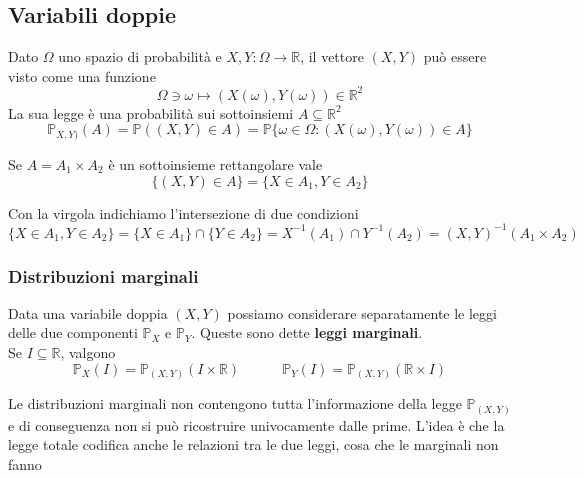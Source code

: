 \subsection{Variabili doppie}
Dato $\Omega$ uno spazio di probabilità e $X,Y:\Omega \to \mathbb{R}$, il vettore $(X,Y)$ può essere visto come una funzione
\begin{equation}
	\Omega \ni \omega \mapsto (X(\omega),Y(\omega))\in \mathbb{R}^2
\end{equation}
La sua legge è una probabilità sui sottoinsiemi $A \subseteq \mathbb{R}^2$
\begin{equation}
	\mathbb{P}_{X,Y)}(A) = \mathbb{P}((X,Y) \in A) = \mathbb{P}\{\omega \in \Omega : (X(\omega), Y(\omega)) \in A\}
\end{equation}

\begin{observation}
	Se $A=A_1 \times A_2$ è un sottoinsieme rettangolare vale
	\begin{equation}
		\{(X,Y) \in A\} = \{X \in A_1, Y \in A_2\}
	\end{equation}
\end{observation}

\begin{note}
	Con la virgola indichiamo l'intersezione di due condizioni
	\begin{equation*}
		\{X \in A_1, Y \in A_2\} = \{X \in A_1\} \cap \{Y \in A_2\} = X^{-1}(A_1) \cap Y^{-1}(A_2) = (X,Y)^{-1}(A_1 \times A_2)
	\end{equation*}
\end{note}

\subsubsection{Distribuzioni marginali}
Data una variabile doppia $(X,Y)$ possiamo considerare separatamente le leggi delle due componenti $\mathbb{P}_X$ e $\mathbb{P}_Y$. Queste sono dette \textbf{leggi marginali}.\\
Se $I \subseteq \mathbb{R}$, valgono
\begin{equation}
	\mathbb{P}_X(I)=\mathbb{P}_{(X,Y)}(I \times \mathbb{R}) \quad\quad\quad \mathbb{P}_Y(I)=\mathbb{P}_{(X,Y)}(\mathbb{R}\times I)
\end{equation}

Le distribuzioni marginali non contengono tutta l'informazione della legge $\mathbb{P}_{(X,Y)}$ e di conseguenza non si può ricostruire univocamente dalle prime. L'idea è che la legge totale codifica anche le relazioni tra le due leggi, cosa che le marginali non fanno

